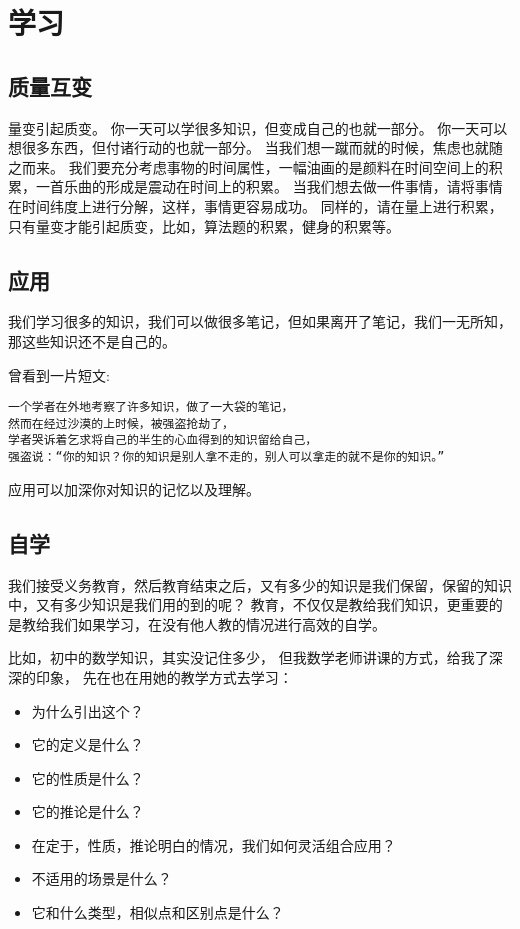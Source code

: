 \chapter{学习}

\section{质量互变}

量变引起质变。 
你一天可以学很多知识，但变成自己的也就一部分。
你一天可以想很多东西，但付诸行动的也就一部分。
当我们想一蹴而就的时候，焦虑也就随之而来。
我们要充分考虑事物的时间属性，一幅油画的是颜料在时间空间上的积累，一首乐曲的形成是震动在时间上的积累。
当我们想去做一件事情，请将事情在时间纬度上进行分解，这样，事情更容易成功。
同样的，请在量上进行积累，只有量变才能引起质变，比如，算法题的积累，健身的积累等。



\section{应用}

我们学习很多的知识，我们可以做很多笔记，但如果离开了笔记，我们一无所知，那这些知识还不是自己的。

曾看到一片短文:
\begin{verbatim}
一个学者在外地考察了许多知识，做了一大袋的笔记，
然而在经过沙漠的上时候，被强盗抢劫了，
学者哭诉着乞求将自己的半生的心血得到的知识留给自己，
强盗说：“你的知识？你的知识是别人拿不走的，别人可以拿走的就不是你的知识。”
\end{verbatim}

应用可以加深你对知识的记忆以及理解。

\section{自学}

我们接受义务教育，然后教育结束之后，又有多少的知识是我们保留，保留的知识中，又有多少知识是我们用的到的呢？
教育，不仅仅是教给我们知识，更重要的是教给我们如果学习，在没有他人教的情况进行高效的自学。

比如，初中的数学知识，其实没记住多少，
但我数学老师讲课的方式，给我了深深的印象，
先在也在用她的教学方式去学习：
\begin{itemize}
\item 为什么引出这个？
\item 它的定义是什么？
\item 它的性质是什么？
\item 它的推论是什么？
\item 在定于，性质，推论明白的情况，我们如何灵活组合应用？
\item 不适用的场景是什么？
\item 它和什么类型，相似点和区别点是什么？
\end{itemize}


